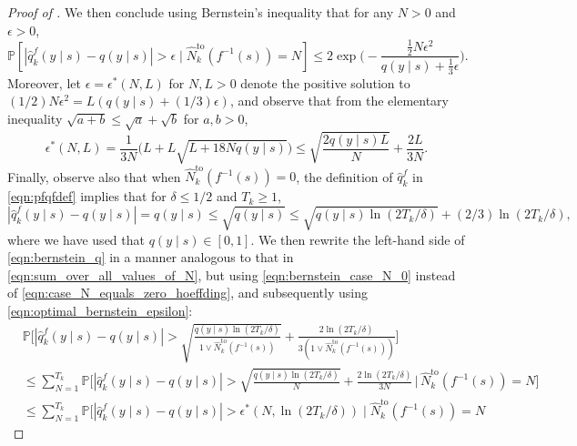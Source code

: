\documentclass[11pt]{article}
\newcommand{\mbbP}{\mathbb{P}}
\newcommand{\bkt}[1]{\left[#1\right]}
\theoremstyle{definition}
\theoremstyle{definition}
\begin{document}
\begin{proof}[Proof of ]
	We then conclude using Bernstein's inequality that for any $N>0$ and $\epsilon>0$,
	\begin{equation}
		\label{eqn:basic_bernstein}
		\mbbP\bkt{
		| \hat{q}^f_k(y\mid s)-q(y\mid s)| > \epsilon
		\mid
		\hat{N}^{\mathrm{to}}_k(f^{-1}(s))=N
		}
		\leq
		2\exp\biggl(
		-
		\frac{\frac{1}{2}N\epsilon^2}{q(y\mid s)+\frac{1}{3}\epsilon}
		\biggr)
		.
	\end{equation}
	Moreover, let $\epsilon=\epsilon^*(N,L)$ for $N,L>0$ denote the positive solution to $(1/2)N\epsilon^2=L(q(y\mid s)+(1/3)\epsilon)$, and observe that from the elementary inequality $\sqrt{a+b}\leq \sqrt{a}+\sqrt{b}$ for $a,b>0$,
	\begin{equation}
		\label{eqn:optimal_bernstein_epsilon}
		\epsilon^*(N,L)
		=
		\frac{1}{3N}
		\bigl(L + L\sqrt{L+18Nq(y\mid s)}\bigr)
		\leq
		\sqrt{\frac{2q(y\mid s)L}{N}} + \frac{2L}{3N}
		.
	\end{equation}
	Finally, observe also that when $\hat{N}^{\mathrm{to}}_k(f^{-1}(s))=0$, the definition of $\hat{q}_k^f$ in \eqref{eqn:pfqfdef} implies that for $\delta\leq 1/2$ and $T_k\geq 1$,
	\begin{equation}
		\label{eqn:bernstein_case_N_0}
		|\hat{q}_k^f(y\mid s)-q(y\mid s)|
		=
		q(y\mid s)
		\leq
		\sqrt{q(y\mid s)}
		\leq
		\sqrt{q(y\mid s)\ln(2T_k/\delta)}+(2/3)\ln(2T_k/\delta)
		,
	\end{equation}
	where we have used that $q(y\mid s)\in[0,1]$.
	We then rewrite the left-hand side of \eqref{eqn:bernstein_q} in a manner analogous to that in \eqref{eqn:sum_over_all_values_of_N}, but using \eqref{eqn:bernstein_case_N_0} instead of \eqref{eqn:case_N_equals_zero_hoeffding}, and subsequently using \eqref{eqn:optimal_bernstein_epsilon}:
	\begin{equation}
		\begin{split}
			 &
			\mbbP\biggl[
			| \hat{q}^f_k(y\mid s)-q(y\mid s) | >
			\sqrt{\frac{q(y\mid s) \ln(2T_k/\delta)}{1\vee\hat{N}^{\mathrm{to}}_k(f^{-1}(s))}}
			+
			\frac{2\ln(2T_k/\delta)}{3(1\vee\hat{N}^{\mathrm{to}}_k(f^{-1}(s)))}
			\biggr]
			\\
			 &
			\leq
			\sum_{N=1}^{T_k}
			\mbbP\biggl[
			|\hat{q}^f_k(y\mid s)-q(y\mid s)|>
			\sqrt{\frac{q(y\mid s) \ln(2T_k/\delta)}{N}}
			+
			\frac{2\ln(2T_k/\delta)}{3N}
			\,\bigg|\,
			\hat{N}^{\mathrm{to}}_k(f^{-1}(s)) = N
			\biggr]
			\\
			 &
			\leq
			\sum_{N=1}^{T_k}
			\mbbP\bigl[
			|\hat{q}^f_k(y\mid s)-q(y\mid s)|>
			\epsilon^*(N,\ln(2T_k/\delta))
			\mid
			\hat{N}^{\mathrm{to}}_k(f^{-1}(s)) = N

\end{split}
\end{equation}
\end{proof}
\end{document}
